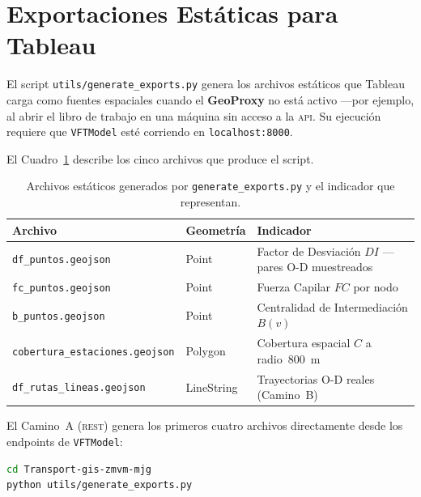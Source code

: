 
\section{Exportaciones \geojson{} Estáticas para Tableau}
\label{anx:tg-exports}

El script \texttt{utils/generate\_exports.py} genera los archivos \geojson{}
estáticos que Tableau carga como fuentes espaciales cuando el \textbf{GeoProxy}
no está activo —por ejemplo, al abrir el libro de trabajo en una máquina sin
acceso a la \textsc{api}. Su ejecución requiere que \texttt{VFTModel} esté
corriendo en \texttt{localhost:8000}.

El Cuadro~\ref{tab:tg-exports} describe los cinco archivos que produce el
script.

\begin{table}[htbp]
    \centering
    \caption[Exportaciones \geojson{} de \texttt{Transport-gis-zmvm-mjg} para Tableau]{Archivos
    \geojson{} estáticos generados por \texttt{generate\_exports.py} y
    el indicador que representan.}
    \label{tab:tg-exports}
    \begin{tabularx}{\textwidth}{|l|l|X|}
        \hline
        \textbf{Archivo} & \textbf{Geometría} & \textbf{Indicador} \\
        \hline
        \texttt{df\_puntos.geojson}           & Point      & Factor de Desviación $DI$ — pares O-D muestreados \\
        \texttt{fc\_puntos.geojson}           & Point      & Fuerza Capilar $FC$ por nodo \\
        \texttt{b\_puntos.geojson}            & Point      & Centralidad de Intermediación $B(v)$ \\
        \texttt{cobertura\_estaciones.geojson} & Polygon    & Cobertura espacial $C$ a radio~800~m \\
        \texttt{df\_rutas\_lineas.geojson}     & LineString & Trayectorias O-D reales (Camino~B) \\
        \hline
    \end{tabularx}
\end{table}

El Camino~A (\textsc{rest}) genera los primeros cuatro archivos directamente
desde los endpoints de \texttt{VFTModel}:

\begin{lstlisting}[style=estiloBase, language=bash,
  caption={Ejecución de \texttt{generate\_exports.py} — Camino~A.},
  label=lst:tg-exports-cmda,
  basicstyle=\small\ttfamily]
cd Transport-gis-zmvm-mjg
python utils/generate_exports.py
\end{lstlisting}

